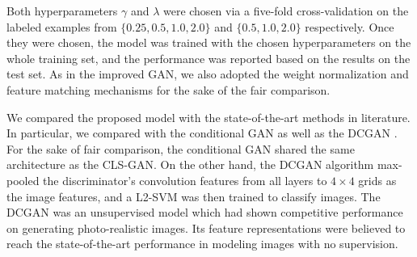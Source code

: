 Both hyperparameters $\gamma$ and $\lambda$ were chosen via a five-fold cross-validation on the labeled examples from $\{0.25, 0.5, 1.0, 2.0\}$ and $\{0.5, 1.0, 2.0\}$ respectively. Once they were chosen, the model was trained with the chosen hyperparameters on the whole training set, and the performance was reported based on the results on the test set. As in the improved GAN, we also adopted the weight normalization and feature matching mechanisms for the sake of the fair comparison.


We compared the proposed model with the state-of-the-art methods in literature.  In particular, we compared with the conditional GAN \cite{mirza2014conditional} as well as the DCGAN \cite{radford2015unsupervised}. For the sake of fair comparison, the conditional GAN shared the same architecture as the CLS-GAN.
On the other hand, the DCGAN algorithm \cite{radford2015unsupervised} max-pooled
the discriminator's convolution features from all layers to $4\times 4$ grids as the image features, and a L2-SVM was then trained to classify images. The DCGAN was an unsupervised model which had shown competitive performance on generating photo-realistic images. Its feature representations were believed to reach the state-of-the-art performance in modeling images with no supervision.





